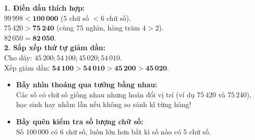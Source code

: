 \documentclass[11pt,a4paper]{article}
\begin{document}
\vspace{-2.5mm}
\noindent
\begin{minipage}[t]{0.49\textwidth}\vspace{0pt}
\begin{tcolorbox}[
  enhanced,
  colback=green!4!white,
  colframe=green!60!black,
  arc=2mm, boxrule=0.8pt,
  left=2mm, right=2mm, top=1.8mm, bottom=1.8mm,
  title={\footnotesize\bfseries\color{white}\faCheckCircle\ Ví dụ thực hành chuẩn mực}
]
{\footnotesize
\textbf{1. Điền dấu thích hợp:}\\
$99\,998 < \mathbf{100\,000}$ ($5$ chữ số $< 6$ chữ số).\\
$75\,420 > \mathbf{75\,240}$ (cùng $75$ nghìn, hàng trăm $4 > 2$).\\
$82\,050 = \mathbf{82\,050}$.\\
\textbf{2. Sắp xếp thứ tự giảm dần:}\\
Cho dãy: $45\,200; 54\,100; 45\,020; 54\,010$.\\
Xếp giảm dần: $\mathbf{54\,100 > 54\,010 > 45\,200 > 45\,020}$.
}
\end{tcolorbox}
\end{minipage}
\hfill
\begin{minipage}[t]{0.49\textwidth}\vspace{0pt}
\begin{tcolorbox}[
  enhanced,
  colback=red!4!white,
  colframe=red!70!black,
  arc=2mm, boxrule=0.8pt,
  left=2mm, right=2mm, top=1.8mm, bottom=1.8mm,
  title={\footnotesize\bfseries\color{white}\faExclamationTriangle\ Mẹo tránh bẫy trắc nghiệm}
]
{\footnotesize
\begin{itemize}\setlength{\itemsep}{1.5pt}\setlength{\leftskip}{-2.5mm}
  \item \textbf{Bẫy nhìn thoáng qua tưởng bằng nhau:}\\
  Các số có chữ số giống nhau nhưng hoán đổi vị trí (ví dụ $75\,420$ và $75\,240$), học sinh hay nhầm lẫn nếu không so sánh kĩ từng hàng!
  \item \textbf{Bẫy quên kiểm tra số lượng chữ số:}\\
  Số $100\,000$ có $6$ chữ số, luôn lớn hơn bất kì số nào có $5$ chữ số.
\end{itemize}
}
\end{tcolorbox}
\end{minipage}
\end{document}
